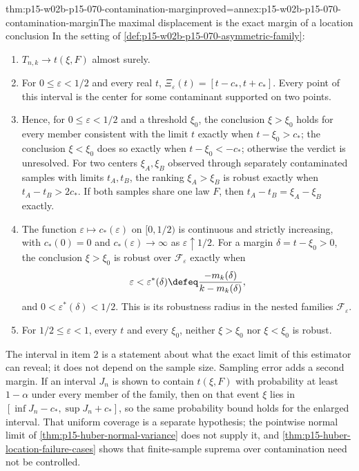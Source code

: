 \begin{hbtheorem}{thm:p15-w02b-p15-070-contamination-margin}{proved=annex:p15-w02b-p15-070-contamination-margin}{The maximal displacement is the exact margin of a location conclusion}
In the setting of \cref{def:p15-w02b-p15-070-asymmetric-family}:
\begin{enumerate}
\item \(T_{n,k}\to t(\xi,F)\) almost surely.
\item For \(0\leq\varepsilon<1/2\) and every real \(t\),
      \(\Xi_\varepsilon(t)=[t-c_*,t+c_*]\). Every point of this interval
      is the center for some contaminant supported on two points.
\item Hence, for \(0\leq\varepsilon<1/2\) and a threshold \(\xi_0\), the conclusion \(\xi>\xi_0\)
      holds for every member consistent with the limit \(t\) exactly when
      \(t-\xi_0>c_*\); the conclusion \(\xi<\xi_0\) does so exactly
      when \(t-\xi_0<-c_*\); otherwise the verdict is unresolved.
      For two centers \(\xi_A,\xi_B\) observed through separately
      contaminated samples with limits \(t_A,t_B\), the ranking
      \(\xi_A>\xi_B\) is robust exactly when \(t_A-t_B>2c_*\).
      If both samples share one law \(F\), then
      \(t_A-t_B=\xi_A-\xi_B\) exactly.
\item The function \(\varepsilon\mapsto c_*(\varepsilon)\) on
      \([0,1/2)\) is continuous and strictly increasing, with
      \(c_*(0)=0\) and \(c_*(\varepsilon)\to\infty\) as
      \(\varepsilon\uparrow1/2\). For a margin \(\delta=t-\xi_0>0\),
      the conclusion \(\xi>\xi_0\) is robust over
      \(\mathcal F_\varepsilon\) exactly when
      \[
       \varepsilon<\varepsilon^*(\delta)\defeq
       \frac{-m_k(\delta)}{k-m_k(\delta)},
      \]
      and \(0<\varepsilon^*(\delta)<1/2\). This is its robustness
      radius in the nested families \(\mathcal F_\varepsilon\).
\item For \(1/2\leq\varepsilon<1\), every \(t\) and every \(\xi_0\),
      neither \(\xi>\xi_0\) nor \(\xi<\xi_0\) is robust.
\end{enumerate}
\end{hbtheorem}

The interval in item 2 is a statement about what the exact limit of this
estimator can reveal; it does not depend on the sample size. Sampling
error adds a second margin. If an interval \(J_n\) is shown to contain
\(t(\xi,F)\) with probability at least \(1-\alpha\) under every member of
the family, then on that event \(\xi\) lies in
\([\inf J_n-c_*,\sup J_n+c_*]\), so the same probability bound holds for
the enlarged interval. That uniform coverage is a separate hypothesis; the
pointwise normal limit of \cref{thm:p15-huber-normal-variance} does not
supply it, and \cref{thm:p15-huber-location-failure-cases} shows that
finite-sample suprema over contamination need not be controlled.

